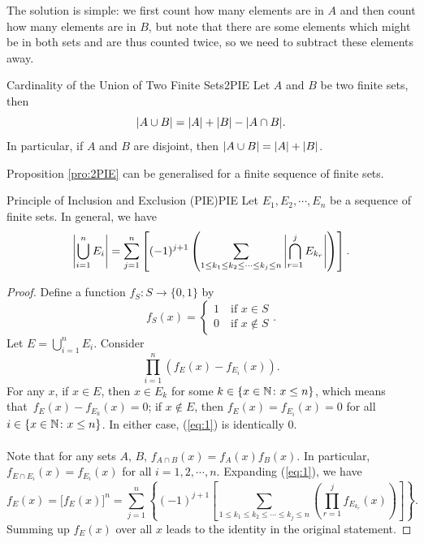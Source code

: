 \documentclass[math]{amznotes}
\theoremstyle{remark}
\newcommand{\0}{\mathbf{0}}
\newcommand{\1}{\mathbf{1}}
\begin{document}
The solution is simple: we first count how many elements are in $A$ and then count how many elements are in $B$, but note that there are some elements which might be in both sets and are thus counted twice, so we need to subtract these elements away.
\begin{probox}{Cardinality of the Union of Two Finite Sets}{2PIE}
    Let $A$ and $B$ be two finite sets, then
    \begin{equation*}
        {\left\lvert {A \cup B} \right\rvert} = {\left\lvert {A} \right\rvert} + {\left\lvert {B} \right\rvert} - {\left\lvert {A \cap B} \right\rvert}.
    \end{equation*}
    In particular, if $A$ and $B$ are disjoint, then ${\left\lvert {A \cup B} \right\rvert} = {\left\lvert {A} \right\rvert} + {\left\lvert {B} \right\rvert}$.
\end{probox}
Proposition \ref{pro:2PIE} can be generalised for a finite sequence of finite sets.
\begin{thmbox}{Principle of Inclusion and Exclusion (PIE)}{PIE}
    Let $E_1, E_2, \cdots, E_n$ be a sequence of finite sets. In general, we have
    \begin{equation*}
        {\left\lvert {\bigcup_{i = 1}^n E_i} \right\rvert} = \sum_{j = 1}^{n} \left[(-1)^{j + 1}\left(\sum_{1 \leq k_1 \leq k_2 \leq \cdots \leq k_j \leq n}{\left\lvert {\bigcap_{r = 1}^{j}E_{k_r}} \right\rvert}\right)\right].
    \end{equation*}
    \tcblower
    \begin{proof}
        Define a function $f_S \colon S \to \{0, 1\}$ by
        \begin{equation*}
            f_S(x) = \begin{cases}
                1 \quad \textrm{if } x \in S \\
                0 \quad \textrm{if } x \notin S
            \end{cases}.
        \end{equation*}
        Let $E = \bigcup_{i = 1}^n E_i$. Consider
        \begin{equation}\label{eq:1}
            \prod_{i = 1}^{n}\left(f_E(x) - f_{E_i}(x)\right). \tag{*}
        \end{equation}
        For any $x$, if $x \in E$, then $x \in E_k$ for some $k \in \left\{x \in \mathbb{N} \colon x \leq n\right\}$, which means that~$f_E(x) - f_{E_k}(x) = 0$; if $x \notin E$, then $f_E(x) = f_{E_i}(x) = 0$ for all $i \in \left\{x \in \mathbb{N} \colon x \leq n\right\}$. In either case, (\ref{eq:1}) is identically $0$.
        \\\\
        Note that for any sets $A$, $B$, $f_{A \cap B}(x) = f_A(x)f_B(x)$. In particular, $f_{E \cap E_i}(x) = f_{E_i}(x)$ for all $i = 1, 2, \cdots, n$. Expanding (\ref{eq:1}), we have
        \begin{equation*}
            f_E(x) = \bigl[f_E(x)\bigr]^n = \sum_{j = 1}^{n} \left\{(-1)^{j + 1}\left[\sum_{1 \leq k_1 \leq k_2 \leq \cdots \leq k_j \leq n}\left(\prod_{r = 1}^{j}f_{E_{k_r}}(x)\right)\right]\right\}.
        \end{equation*}
        Summing up $f_E(x)$ over all $x$ leads to the identity in the original statement.
    \end{proof}
\end{thmbox}
\end{document}

